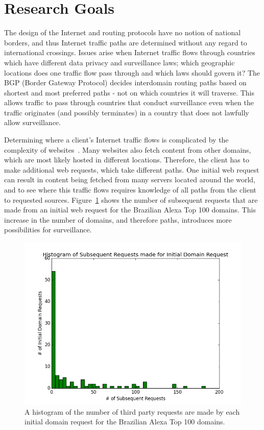 \section{Research Goals}

The design of the Internet and routing protocols have no notion of national borders, and thus Internet traffic paths are determined without any regard to international crossings.  Issues arise when Internet traffic flows through countries which have different data privacy and surveillance laws; which geographic locations does one traffic flow pass through and which laws should govern it?  The BGP (Border Gateway Protocol) decides interdomain routing paths based on shortest and most preferred paths - not on which countries it will traverse.  This allows traffic to pass through countries that conduct surveillance even when the traffic originates (and possibly terminates) in a country that does not lawfully allow surveillance.  

Determining where a client's Internet traffic flows is complicated by the complexity of websites~\cite{butkiewicz2011understanding}.  Many websites also fetch content from other domains, which are most likely hosted in different locations.  Therefore, the client has to make additional web requests, which take different paths.  One initial web request can result in content being fetched from many servers located around the world, and to see where this traffic flows requires knowledge of all paths from the client to requested sources.  Figure~\ref{fig:domains} shows the number of subsequent requests that are made from an initial web request for the Brazilian Alexa Top 100 domains.  This increase in the number of domains, and therefore paths, introduces more possibilities for surveillance.

\begin{figure}
\centering
\includegraphics[width=.5\textwidth]{subsequent_request_hist}
\caption{A histogram of the number of third party requests are made by each initial domain request for the Brazilian Alexa Top 100 domains.}
\label{fig:domains}
\end{figure}

